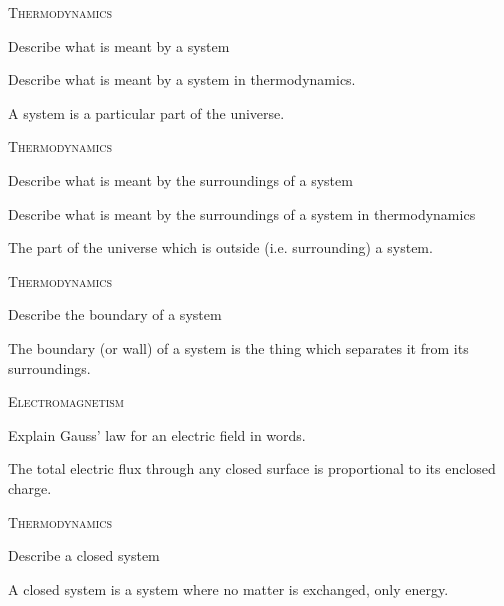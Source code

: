 \documentclass{article}
\newenvironment{flashcard}[2][]
  {\noindent\textsc{\Large#1}\par\vfill
   {\centering\Large#2\par}
   \vfill
   \newpage\Large\centering
  }
  {\newpage}
\begin{document}

\begin{flashcard}[Thermodynamics]{Describe what is meant by a system}
Describe what is meant by a system in thermodynamics.

A system is a particular part of the universe.
\newline

\end{flashcard}


\begin{flashcard}[Thermodynamics]{Describe what is meant by the surroundings of a system}
Describe what is meant by the surroundings of a system in thermodynamics

The part of the universe which is outside (i.e. surrounding) a system.
\end{flashcard}



\begin{flashcard}[Thermodynamics]{Describe the boundary of a system}

The boundary (or wall) of a system is the thing which separates it from its surroundings.

\end{flashcard}



\begin{flashcard}[Electromagnetism]{Explain Gauss' law for an electric field in words.}

The total electric flux through any closed surface is proportional to its enclosed charge.
\end{flashcard}


\begin{flashcard}[Thermodynamics]{Describe a closed system}

A closed system is a system where no matter is exchanged, only energy.
\end{flashcard}
\end{document}
